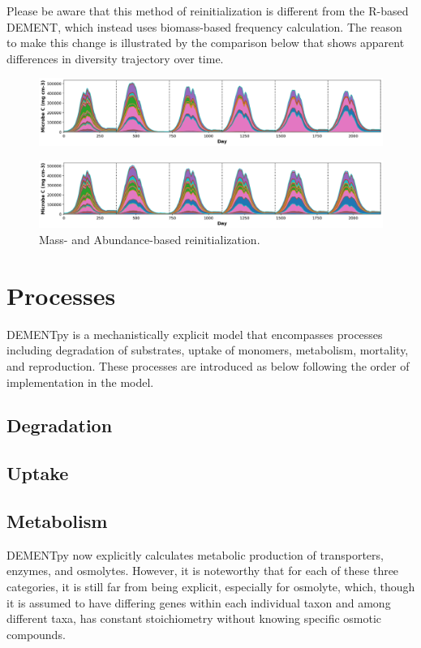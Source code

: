 \documentclass[12pt, oneside, titlepage]{article}   	%
\begin{document}
Please be aware that this method of reinitialization is different from the R-based DEMENT, which instead uses biomass-based frequency calculation. The reason to make this change is illustrated by the comparison below that shows apparent differences in diversity trajectory over time.

\begin{figure}[H]
  \centering
  \includegraphics[width=\linewidth]{Fig_Mass_based_reinitialization.png}
  \label{fig:reinitialization}
\end{figure}

\begin{figure}[H]
  \centering
  \includegraphics[width=\linewidth]{Fig_Abundance_based_reinitialization.png}
  \caption{Mass- and Abundance-based reinitialization.}
  \label{fig:reinitialization}
\end{figure}




\section{Processes}
DEMENTpy is a mechanistically explicit model that encompasses processes including degradation of substrates, uptake of monomers, metabolism, mortality, and reproduction. These processes are introduced as below following the order of implementation in the model.
\subsection{Degradation}

\subsection{Uptake}

\subsection{Metabolism}
DEMENTpy now explicitly calculates metabolic production of transporters, enzymes, and osmolytes. However, it is noteworthy that for each of these three categories, it is still far from being explicit, especially for osmolyte, which, though it is assumed to have differing genes within each individual taxon and among different taxa, has constant stoichiometry without knowing specific osmotic compounds.
\end{document}
